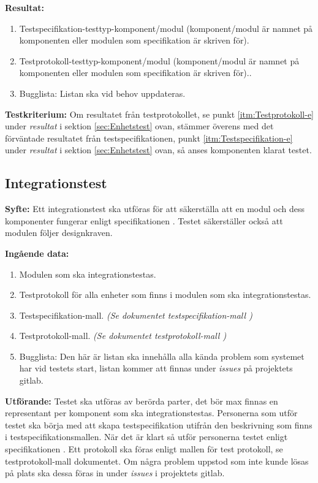 \documentclass[a4paper,10pt, twoside]{article}
\begin{document}
  \textbf{Resultat:}
    \begin{enumerate}
      \item \label{itm:Testspecifikation-e}
      Testspecifikation-testtyp-komponent/modul (komponent/modul är namnet på
      komponenten eller modulen som specifikation är skriven för).
      \item \label{itm:Testprotokoll-e} Testprotokoll-testtyp-komponent/modul
      (komponent/modul är namnet på komponenten eller modulen som specifikation
      är skriven för)..
      \item Bugglista: Listan ska vid behov uppdateras.
    \end{enumerate}

  \textbf{Testkriterium:} Om resultatet från testprotokollet, se punkt
   \ref{itm:Testprotokoll-e} under \emph{resultat} i sektion \ref{sec:Enhetstest}
  ovan, stämmer överens med det förväntade resultatet från testspecifikationen,
  punkt \ref{itm:Testspecifikation-e} under \emph{resultat} i sektion
  \ref{sec:Enhetstest} ovan, så anses komponenten klarat testet.

\subsection{Integrationstest}
\label{sec:Integrationstest}
\textbf{Syfte:}
Ett integrationstest ska utföras för att säkerställa att en modul och dess
komponenter fungerar enligt specifikationen \cite{kravspec}. Testet säkerställer
också att modulen följer designkraven.

\textbf{Ingående data:}
  \begin{enumerate}
    \item Modulen som ska integrationstestas.
    \item Testprotokoll för alla enheter som finns i modulen som ska
    integrationstestas.
    \item Testspecifikation-mall. \emph{(Se dokumentet testspecifikation-mall
    \cite{testspec-mall})}
    \item Testprotokoll-mall. \emph{(Se dokumentet testprotokoll-mall
    \cite{testprot-mall})}
    \item Bugglista: Den här är listan ska innehålla alla kända problem som
    systemet har vid testets start, listan kommer att finnas under \emph{issues}
    på projektets gitlab.
  \end{enumerate}

\textbf{Utförande:} Testet ska utföras av berörda parter, det bör max finnas en
representant per komponent som ska integrationstestas. Personerna som utför
testet ska börja med att skapa testspecifikation utifrån den beskrivning som
finns i testspecifikationsmallen. När det är klart så utför personerna
testet enligt specifikationen \cite{kravspec}. Ett protokoll ska föras enligt
mallen för test
protokoll, se testprotokoll-mall dokumentet. Om några problem uppstod som inte
kunde lösas på plats ska dessa föras in under \emph{issues} i projektets gitlab.
\end{document}
